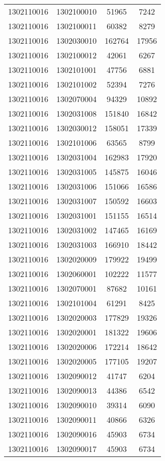 \begin{longtable}[h]{llcc}
		1302110016 & 1302100010 & 51965 & 7242\\
		1302110016 & 1302100011 & 60382 & 8279\\
		1302110016 & 1302030010 & 162764 & 17956\\
		1302110016 & 1302100012 & 42061 & 6267\\
		1302110016 & 1302101001 & 47756 & 6881\\
		1302110016 & 1302101002 & 52394 & 7276\\
		1302110016 & 1302070004 & 94329 & 10892\\
		1302110016 & 1302031008 & 151840 & 16842\\
		1302110016 & 1302030012 & 158051 & 17339\\
		1302110016 & 1302101006 & 63565 & 8799\\
		1302110016 & 1302031004 & 162983 & 17920\\
		1302110016 & 1302031005 & 145875 & 16046\\
		1302110016 & 1302031006 & 151066 & 16586\\
		1302110016 & 1302031007 & 150592 & 16603\\
		1302110016 & 1302031001 & 151155 & 16514\\
		1302110016 & 1302031002 & 147465 & 16169\\
		1302110016 & 1302031003 & 166910 & 18442\\
		1302110016 & 1302020009 & 179922 & 19499\\
		1302110016 & 1302060001 & 102222 & 11577\\
		1302110016 & 1302070001 & 87682 & 10161\\
		1302110016 & 1302101004 & 61291 & 8425\\
		1302110016 & 1302020003 & 177829 & 19326\\
		1302110016 & 1302020001 & 181322 & 19606\\
		1302110016 & 1302020006 & 172214 & 18642\\
		1302110016 & 1302020005 & 177105 & 19207\\
		1302110016 & 1302090012 & 41747 & 6204\\
		1302110016 & 1302090013 & 44386 & 6542\\
		1302110016 & 1302090010 & 39314 & 6090\\
		1302110016 & 1302090011 & 40866 & 6326\\
		1302110016 & 1302090016 & 45903 & 6734\\
		1302110016 & 1302090017 & 45903 & 6734\\

\end{longtable}
